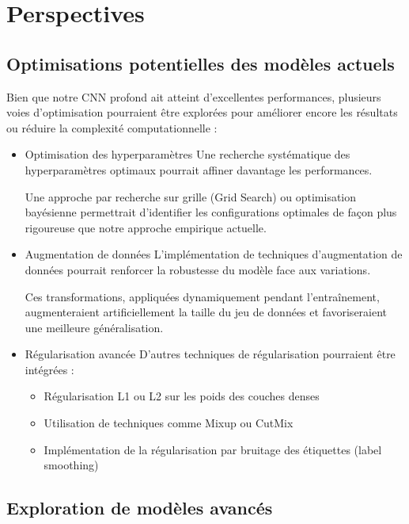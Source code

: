 
\chapter{Perspectives}

\section{Optimisations potentielles des modèles actuels}
\begin{flushleft}
Bien que notre CNN profond ait atteint d'excellentes performances, plusieurs voies d'optimisation pourraient être explorées pour améliorer encore les résultats ou réduire la complexité computationnelle :

\bigskip
\begin{itemize}
\item Optimisation des hyperparamètres
Une recherche systématique des hyperparamètres optimaux pourrait affiner davantage les performances.

Une approche par recherche sur grille (Grid Search) ou optimisation bayésienne permettrait d'identifier les configurations optimales de façon plus rigoureuse que notre approche empirique actuelle.

\item Augmentation de données
L'implémentation de techniques d'augmentation de données pourrait renforcer la robustesse du modèle face aux variations.

Ces transformations, appliquées dynamiquement pendant l'entraînement, augmenteraient artificiellement la taille du jeu de données et favoriseraient une meilleure généralisation. 

\item Régularisation avancée
D'autres techniques de régularisation pourraient être intégrées :
\begin{itemize}
\item Régularisation L1 ou L2 sur les poids des couches denses
\item Utilisation de techniques comme Mixup ou CutMix
\item Implémentation de la régularisation par bruitage des étiquettes (label smoothing) 
\end{itemize}
\end{itemize}
\end{flushleft}

\section{Exploration de modèles avancés}

